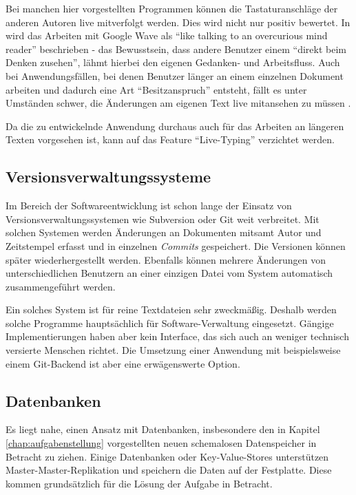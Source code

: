 Bei manchen hier vorgestellten Programmen können die Tastaturanschläge der anderen Autoren live mitverfolgt werden. Dies wird nicht nur positiv bewertet. In \cite{google:wavetyping} wird das Arbeiten mit Google Wave als \enquote{like talking to an overcurious mind reader} beschrieben - das Bewusstsein, dass andere Benutzer einem \enquote{direkt beim Denken zusehen}, lähmt hierbei den eigenen Gedanken- und Arbeitsfluss. Auch bei Anwendungsfällen, bei denen Benutzer länger an einem einzelnen Dokument arbeiten und dadurch eine Art \enquote{Besitzanspruch} entsteht, fällt es unter Umständen schwer, die Änderungen am eigenen Text live mitansehen zu müssen . 

Da die zu entwickelnde Anwendung durchaus auch für das Arbeiten an längeren Texten vorgesehen ist, kann auf das Feature \enquote{Live-Typing} verzichtet werden.

\subsection{Versionsverwaltungssysteme}

Im Bereich der Softwareentwicklung ist schon lange der Einsatz von Versionsverwaltungssystemen wie Subversion \cite{subversion:website} oder Git \cite{git:website} weit verbreitet. Mit solchen Systemen werden Änderungen an Dokumenten mitsamt Autor und Zeitstempel erfasst und in einzelnen \textit{Commits} gespeichert. Die Versionen können später wiederhergestellt werden. Ebenfalls können mehrere Änderungen von unterschiedlichen Benutzern an einer einzigen Datei vom System automatisch zusammengeführt werden.

Ein solches System ist für reine Textdateien sehr zweckmäßig. Deshalb werden solche Programme hauptsächlich für Software-Verwaltung eingesetzt. Gängige Implementierungen haben aber kein Interface, das sich auch an weniger technisch versierte Menschen richtet. Die Umsetzung einer Anwendung mit beispielsweise einem Git-Backend ist aber eine erwägenswerte Option.

\subsection{Datenbanken}

Es liegt nahe, einen Ansatz mit Datenbanken, insbesondere den in Kapitel \ref{chap:aufgabenstellung} vorgestellten neuen schemalosen Datenspeicher in Betracht zu ziehen. Einige Datenbanken oder Key-Value-Stores unterstützen Master-Master-Replikation und speichern die Daten auf der Festplatte. Diese kommen grundsätzlich für die Lösung der Aufgabe in Betracht.


